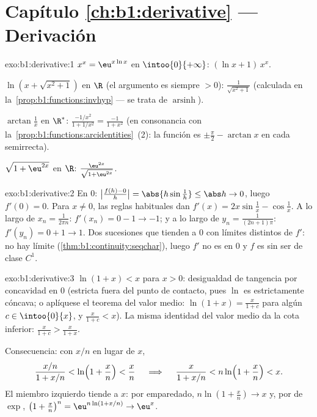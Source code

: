 \section*{Capítulo \ref{ch:b1:derivative} --- Derivación}

\begin{solution}{exo:b1:derivative:1}
$x^x = \eu^{x\ln x}$ en $\intoo{0}{+\infty}$:  $(\ln x +
1)\,x^x$.

$\ln(x + \sqrt{x^2+1})$ en $\R$ (el argumento es siempre $> 0$):
 $\frac{1}{\sqrt{x^2+1}}$ (calculada en
la~\cref{prop:b1:functions:invhyp} --- se trata de
$\operatorname{arsinh}$).

$\arctan\frac1x$ en $\R^*$: 
$\frac{-1/x^2}{1 + 1/x^2} = \frac{-1}{1 + x^2}$ (en consonancia con
la~\cref{prop:b1:functions:arcidentities}~(2): la función es
$\pm\frac\pi2 - \arctan x$ en cada semirrecta).

$\sqrt{1 + \eu^{2x}}$ en $\R$: 
$\frac{\eu^{2x}}{\sqrt{1 + \eu^{2x}}}$.
\end{solution}

\begin{solution}{exo:b1:derivative:2}
En $0$: $\bigl|\frac{f(h) - 0}{h}\bigr| = \abs{h \sin\frac1h} \leq
\abs h \to 0$, luego $f'(0) = 0$. Para $x \neq 0$, las reglas
habituales dan $f'(x) = 2x\sin\frac1x - \cos\frac1x$. A lo largo de
$x_n = \frac{1}{2\pi n}$: $f'(x_n) = 0 - 1 \to -1$; y a lo largo de
$y_n = \frac{1}{(2n+1)\pi}$: $f'(y_n) = 0 + 1 \to 1$. Dos sucesiones
que tienden a $0$ con límites distintos de $f'$: no hay límite
(\cref{thm:b1:continuity:seqchar}), luego $f'$ no es  en $0$
y $f$ es  sin ser de clase $C^1$.
\end{solution}

\begin{solution}{exo:b1:derivative:3}
$\ln(1+x) < x$ para $x > 0$: desigualdad de tangencia por concavidad
en $0$ (estricta fuera del punto de contacto, pues $\ln$ es
estrictamente cóncava; o aplíquese el teorema del valor medio:
$\ln(1+x) = \frac{x}{1+c}$ para algún $c \in \intoo{0}{x}$, y
$\frac{x}{1+c} < x$). La misma identidad del valor medio da la cota
inferior: $\frac{x}{1+c} > \frac{x}{1+x}$.

Consecuencia: con $x/n$ en lugar de $x$,
\[
\frac{x/n}{1 + x/n} < \ln\Bigl(1 + \frac xn\Bigr) < \frac xn
\quad\implies\quad
\frac{x}{1 + x/n} < n \ln\Bigl(1 + \frac xn\Bigr) < x .
\]
El miembro izquierdo tiende a $x$: por emparedado,
$n\ln(1 + \frac xn) \to x$ y, por  de $\exp$,
$\bigl(1 + \frac xn\bigr)^n = \eu^{n\ln(1 + x/n)} \to \eu^x$.
\end{solution}

